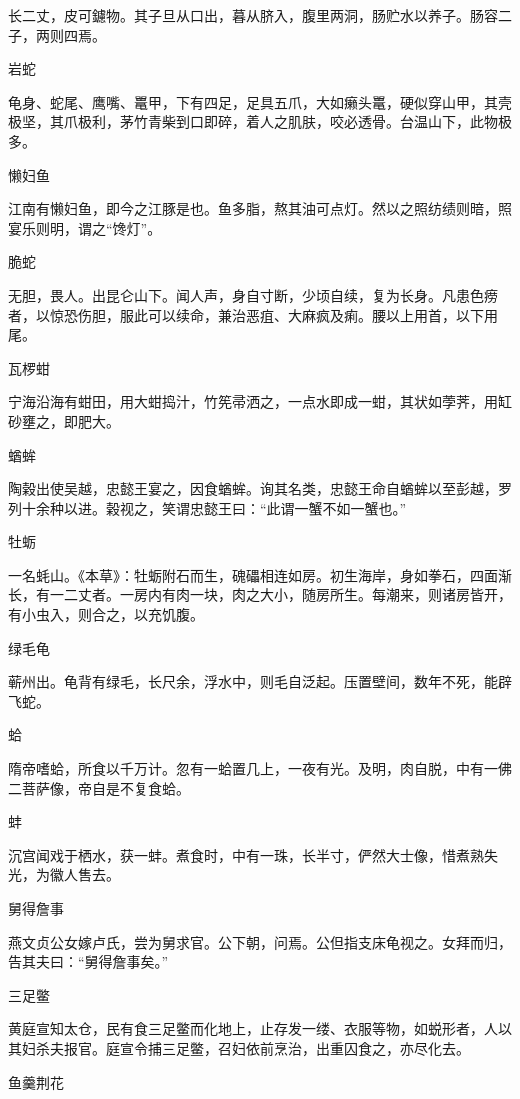 \documentclass[a4paper,12pt,UTF8,twoside]{ctexbook}
\begin{document}
    长二丈，皮可鑢物。其子旦从口出，暮从脐入，腹里两洞，肠贮水以养子。肠容二子，两则四焉。
    
    岩蛇
    
    龟身、蛇尾、鹰嘴、鼍甲，下有四足，足具五爪，大如癞头鼍，硬似穿山甲，其壳极坚，其爪极利，茅竹青柴到口即碎，着人之肌肤，咬必透骨。台温山下，此物极多。
    
    懒妇鱼
    
    江南有懒妇鱼，即今之江豚是也。鱼多脂，熬其油可点灯。然以之照纺绩则暗，照宴乐则明，谓之“馋灯”。
    
    脆蛇
    
    无胆，畏人。出昆仑山下。闻人声，身自寸断，少顷自续，复为长身。凡患色痨者，以惊恐伤胆，服此可以续命，兼治恶疽、大麻疯及痢。腰以上用首，以下用尾。
    
    瓦椤蚶
    
    宁海沿海有蚶田，用大蚶捣汁，竹筅帚洒之，一点水即成一蚶，其状如荸荠，用缸砂壅之，即肥大。
    
    蝤蛑
    
    陶榖出使吴越，忠懿王宴之，因食蝤蛑。询其名类，忠懿王命自蝤蛑以至彭越，罗列十余种以进。榖视之，笑谓忠懿王曰：“此谓一蟹不如一蟹也。”
    
    牡蛎
    
    一名蚝山。《本草》：牡蛎附石而生，磈礧相连如房。初生海岸，身如拳石，四面渐长，有一二丈者。一房内有肉一块，肉之大小，随房所生。每潮来，则诸房皆开，有小虫入，则合之，以充饥腹。
    
    绿毛龟
    
    蕲州出。龟背有绿毛，长尺余，浮水中，则毛自泛起。压置壁间，数年不死，能辟飞蛇。
    
    蛤
    
    隋帝嗜蛤，所食以千万计。忽有一蛤置几上，一夜有光。及明，肉自脱，中有一佛二菩萨像，帝自是不复食蛤。
    
    蚌
    
    沉宫闻戏于栖水，获一蚌。煮食时，中有一珠，长半寸，俨然大士像，惜煮熟失光，为徽人售去。
    
    舅得詹事
    
    燕文贞公女嫁卢氏，尝为舅求官。公下朝，问焉。公但指支床龟视之。女拜而归，告其夫曰：“舅得詹事矣。”
    
    三足鳖
    
    黄庭宣知太仓，民有食三足鳖而化地上，止存发一缕、衣服等物，如蜕形者，人以其妇杀夫报官。庭宣令捕三足鳖，召妇依前烹治，出重囚食之，亦尽化去。
    
    鱼羹荆花
    
\end{document}
